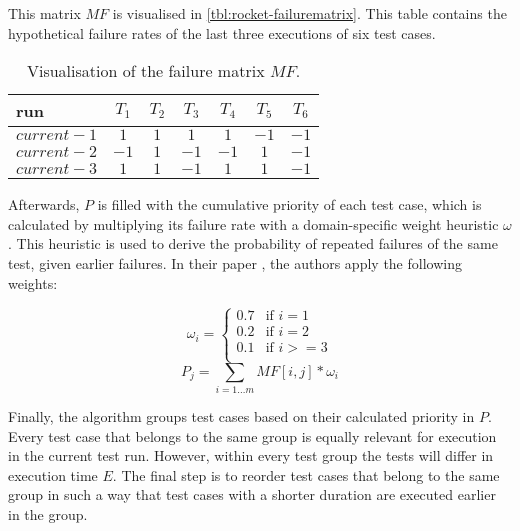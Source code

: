 \noindent This matrix $MF$ is visualised in \autoref{tbl:rocket-failurematrix}. This table contains the hypothetical failure rates of the last three executions of six test cases.\\

\begin{table}[h]
\centering
\begin{tabular}{| l || c | c | c | c | c | c |}
	\hline
	\textbf{run} & \textbf{$T_1$} & \textbf{$T_2$} & \textbf{$T_3$} & \textbf{$T_4$} & \textbf{$T_5$} & \textbf{$T_6$}\\\hline
	$current - 1$ & $1$ & $1$ & $1$ & $1$ & $-1$ & $-1$\\
	$current - 2$ & $-1$ & $1$ & $-1$ & $-1$ & $1$ & $-1$\\
	$current - 3$ & $1$ & $1$ & $-1$ & $1$ & $1$ & $-1$\\
	\hline
\end{tabular}
\caption{Visualisation of the failure matrix $MF$.}
\label{tbl:rocket-failurematrix}
\end{table}

\noindent Afterwards, $P$ is filled with the cumulative priority of each test case, which is calculated by multiplying its failure rate with a domain-specific weight heuristic $\omega$. This heuristic is used to derive the probability of repeated failures of the same test, given earlier failures. In their paper \cite{6676952}, the authors apply the following weights:

\[
\omega_i = \left\{
\begin{array}{rl}
0.7 & \text{if } i = 1 \\
0.2 & \text{if } i = 2 \\
0.1 & \text{if } i >= 3 \\
\end{array}
\right.
\]
$$P_j = \sum_{i = 1 \dots m} MF[i, j] * \omega_i$$

\noindent Finally, the algorithm groups test cases based on their calculated priority in $P$. Every test case that belongs to the same group is equally relevant for execution in the current test run. However, within every test group the tests will differ in execution time $E$. The final step is to reorder test cases that belong to the same group in such a way that test cases with a shorter duration are executed earlier in the group.

